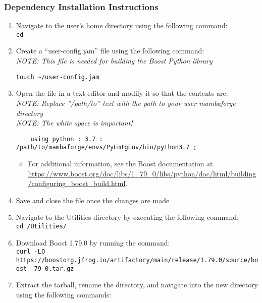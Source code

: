 \subsubsection{Dependency Installation Instructions}
\begin{enumerate}
	\item Navigate to the user's home directory using the following command: \\
	
	\texttt{cd}
	\item Create a ``user-config.jam'' file using the following command: \\
	\textit{NOTE: This file is needed for building the Boost Python library}
	
	\verb|touch ~/user-config.jam|
	\item Open the file in a text editor and modify it so that the contents are: \\
	\textit{NOTE: Replace ''/path/to'' text with the path to your user mambaforge directory} \\
	\textit{NOTE: The white space is important!}

	\begin{verbatim}
	using python : 3.7 : /path/to/mambaforge/envs/PyEmtgEnv/bin/python3.7 ;
	\end{verbatim}
	
	\begin{itemize}
		\item For additional information, see the Boost documentation at \url{https://www.boost.org/doc/libs/1_79_0/libs/python/doc/html/building/configuring_boost_build.html}.	
	\end{itemize}
	
	\item Save and close the file once the changes are made
	\item Navigate to the Utilities directory by executing the following command: \\

	\texttt{cd /Utilities/}
	\item Download Boost 1.79.0 by running the command: \\

	\texttt{curl -LO https://boostorg.jfrog.io/artifactory/main/release/1.79.0/source/boost\_\newline{}\_79\_0.tar.gz}

	\item Extract the tarball, rename the directory, and navigate into the new directory using the following commands: 


\end{enumerate}
